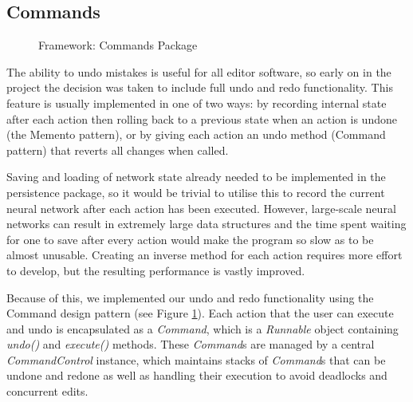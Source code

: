 \documentclass{acm_proc_article-sp}
\begin{document}
\subsection{Commands}
{
\begin{figure}[t]
\centering
{}
\caption{Framework: Commands Package}
\label{fig:framework:commands}
\end{figure}
The ability to undo mistakes is useful for all editor software, so early on in the project the decision was taken to include full undo and redo functionality. This feature is usually implemented in one of two ways: by recording internal state after each action then rolling back to a previous state when an action is undone (the Memento pattern), or by giving each action an undo method (Command pattern) that reverts all changes when called.

Saving and loading of network state already needed to be implemented in the persistence package, so it would be trivial to utilise this to record the current neural network after each action has been executed. However, large{}-scale neural networks can result in extremely large data structures and the time spent waiting for one to save after every action would make the program so slow as to be almost unusable. Creating an inverse method for each action requires more effort to develop, but the resulting performance is vastly improved.

Because of this, we implemented our undo and redo functionality using the Command design pattern (see Figure \ref{fig:framework:commands}). Each action that the user can execute and undo is encapsulated as a {\textit{Command}}, which is a {\textit{Runnable}} object containing {\textit{undo()}} and {\textit{execute()}} methods. These {\textit{Command}}s are managed by a central {\textit{CommandControl}} instance, which maintains stacks of {\textit{Command}}s that can be undone and redone as well as handling their execution to avoid deadlocks and concurrent edits.

}
\end{document}
